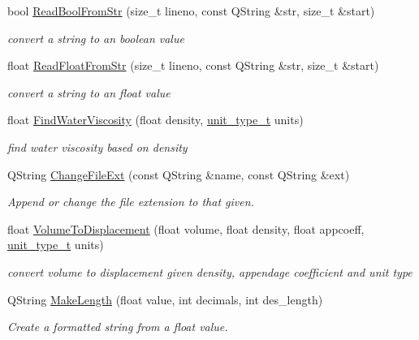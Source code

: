 \begin{DoxyCompactItemize}
bool \hyperlink{namespaceShipCAD_af343b5a2dfd09b32b9451d35e0676384}{Read\+Bool\+From\+Str} (size\+\_\+t lineno, const Q\+String \&str, size\+\_\+t \&start)
\begin{DoxyCompactList}\small\item\em convert a string to an boolean value \end{DoxyCompactList}\item 
float \hyperlink{namespaceShipCAD_a696bc38864a736dda734802f3cda4346}{Read\+Float\+From\+Str} (size\+\_\+t lineno, const Q\+String \&str, size\+\_\+t \&start)
\begin{DoxyCompactList}\small\item\em convert a string to an float value \end{DoxyCompactList}\item 
float \hyperlink{namespaceShipCAD_a44025ef38e6ee9f12cbf032660f637b5}{Find\+Water\+Viscosity} (float density, \hyperlink{namespaceShipCAD_ac6a7a28b4b063771afae92decb602da5}{unit\+\_\+type\+\_\+t} units)
\begin{DoxyCompactList}\small\item\em find water viscosity based on density \end{DoxyCompactList}\item 
Q\+String \hyperlink{namespaceShipCAD_ae416df4a72579eb3a1a418b19551eb53}{Change\+File\+Ext} (const Q\+String \&name, const Q\+String \&ext)
\begin{DoxyCompactList}\small\item\em Append or change the file extension to that given. \end{DoxyCompactList}\item 
float \hyperlink{namespaceShipCAD_ad3ca198e79658bf065f1c1c416f23670}{Volume\+To\+Displacement} (float volume, float density, float appcoeff, \hyperlink{namespaceShipCAD_ac6a7a28b4b063771afae92decb602da5}{unit\+\_\+type\+\_\+t} units)
\begin{DoxyCompactList}\small\item\em convert volume to displacement given density, appendage coefficient and unit type \end{DoxyCompactList}\item 
Q\+String \hyperlink{namespaceShipCAD_ae378a523725f5718c9f2b55103f08dcb}{Make\+Length} (float value, int decimals, int des\+\_\+length)
\begin{DoxyCompactList}\small\item\em Create a formatted string from a float value. \end{DoxyCompactList}\item 

\end{DoxyCompactItemize}
